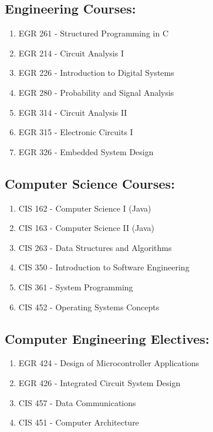 \documentclass[12pt]{article}
\numberwithin{figure}{section}
\numberwithin{equation}{section}
\begin{document}
{\subsection{Engineering Courses:}\label{engineering-courses}
\begin{enumerate}
\itemsep1pt\parskip0pt
\item EGR 261 - Structured Programming in C
\item EGR 214 - Circuit Analysis I
\item EGR 226 - Introduction to Digital Systems
\item EGR 280 - Probability and Signal Analysis
\item EGR 314 - Circuit Analysis II
\item EGR 315 - Electronic Circuits I
\item EGR 326 - Embedded System Design
\end{enumerate}

\subsection{Computer Science Courses:}\label{computer-science-courses}
\begin{enumerate}
\itemsep1pt\parskip0pt
\item CIS 162 - Computer Science I (Java)
\item CIS 163 - Computer Science II (Java)
\item CIS 263 - Data Structures and Algorithms
\item CIS 350 - Introduction to Software Engineering
\item CIS 361 - System Programming
\item CIS 452 - Operating Systems Concepts
\end{enumerate}

\subsection{Computer Engineering
Electives:}\label{computer-engineering-electives}
\begin{enumerate}
\itemsep1pt\parskip0pt
\item EGR 424 - Design of Microcontroller Applications
\item EGR 426 - Integrated Circuit System Design
\item CIS 457 - Data Communications
\item CIS 451 - Computer Architecture
\end{enumerate}

}
\end{document}
